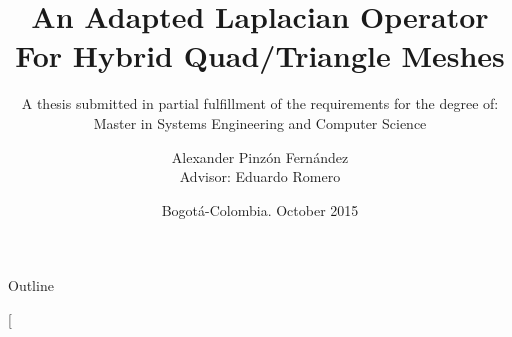 \documentclass[10pt, compress, english]{beamer}
\makeatletter
\newcommand\makebeamertitle{\frame{\maketitle}}%
\let\origtableofcontents=\tableofcontents
\def\tableofcontents{\@ifnextchar[{\origtableofcontents}{\gobbletableofcontents}}
\def\gobbletableofcontents#1{\origtableofcontents}
\makeatother
\begin{document}
\title[cim@lab]{An Adapted Laplacian Operator For Hybrid Quad/Triangle Meshes}

\subtitle{\textmd{\footnotesize{}A thesis submitted in partial fulfillment
of the requirements for the degree of:}\\
Master in Systems Engineering and Computer Science}

\author[Alexander Pinzón, Eduardo Romero]{Alexander Pinzón Fernández\\
{\footnotesize{}Advisor: Eduardo Romero}}


\date{Bogotá-Colombia. October 2015}

\makebeamertitle


\begin{frame}{Outline}

\tableofcontents{}

\end{frame}
\end{document}
